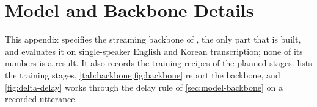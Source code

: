 \providecommand{\mdltok}[1]{\ensuremath{\langle\mathrm{#1}\rangle}}

\section{Model and Backbone Details}\label{app:model}

This appendix specifies the streaming backbone of \model, the only part that is built, and evaluates it on single-speaker English and Korean transcription; none of its numbers is a \task result. It also records the training recipes of the planned stages.  lists the training stages, \cref{tab:backbone,fig:backbone} report the backbone, and \cref{fig:delta-delay} works through the delay rule of \cref{sec:model-backbone} on a recorded utterance.

